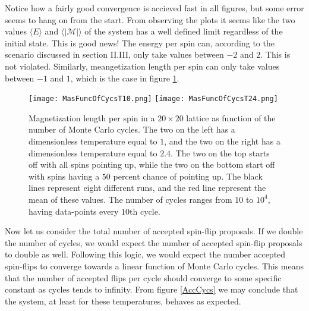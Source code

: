 \documentclass[twoside,utf8]{article}
\newcommand{\expe}[1]{ \langle #1 \rangle }
\begin{document}
\noindent
Notice how a fairly good convergence is accieved fast in all figures, but some error seems to hang on from the start. From observing the plots it seems like the two values $\expe{E}$ and $\expe{|\mathcal{M}|}$ of the system has a well defined limit regardless of the initial state. This is good news! The energy per spin can, according to the scenario discussed in section II.III, only take values between $-2$ and $2$. This is not violated. Similarly, meangetization length per spin can only take values between $-1$ and $1$, which is the case in figure \ref*{MvsCycs}. 



\begin{figure}[H]
\begin{center}
\texttt{[image: MasFuncOfCycsT10.png]}
\texttt{[image: MasFuncOfCycsT24.png]}
\end{center}
\caption{
Magnetization length per spin in a $20\times 20$ lattice as function of the number of Monte Carlo cycles. The two on the left has a dimensionless temperature equal to $1$, and the two on the right has a dimensionless temperature equal to $2.4$. The two on the top starts off with all spins pointing up, while the two on the bottom start off with spins having a $50$ percent chance of pointing up. The black lines represent eight different runs, and the red line represent the mean of these values. The number of cycles ranges from $10$ to $10^4$, having data-points every $10$th cycle.
}
\label{MvsCycs}
\end{figure}


\noindent
Now let us consider the total number of accepted spin-flip proposals. If we double the number of cycles, we would expect the number of accepted spin-flip proposals to double as well. Following this logic, we would expect the number accepted spin-flips to converge towards a linear function of Monte Carlo cycles. This means that the number of accepted flips per cycle should converge to some specific constant as cycles tends to infinity. From figure \ref*{AccCycs} we may conclude that the system, at least for these temperatures, behaves as expected. 
\end{document}
